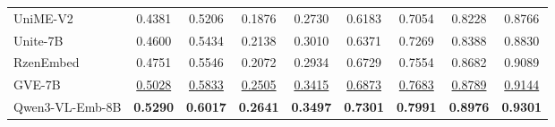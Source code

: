 \begin{table}[t]
\begin{tabular}{@{}l|*{8}{c}@{}}
UniME-V2         & 0.4381 & 0.5206 & 0.1876 & 0.2730 & 0.6183 & 0.7054 & 0.8228 & 0.8766 \\
Unite-7B         & 0.4600 & 0.5434 & 0.2138 & 0.3010 & 0.6371 & 0.7269 & 0.8388 & 0.8830 \\
RzenEmbed        & 0.4751 & 0.5546 & 0.2072 & 0.2934 & 0.6729 & 0.7554 & 0.8682 & 0.9089 \\
GVE-7B           & \underline{0.5028} & \underline{0.5833} & \underline{0.2505} & \underline{0.3415} & \underline{0.6873} & \underline{0.7683} & \underline{0.8789} & \underline{0.9144} \\
Qwen3-VL-Emb-8B  & \textbf{0.5290} & \textbf{0.6017} & \textbf{0.2641} & \textbf{0.3497} & \textbf{0.7301} & \textbf{0.7991} & \textbf{0.8976} & \textbf{0.9301} \\
\bottomrule
\end{tabular}
\end{table}

